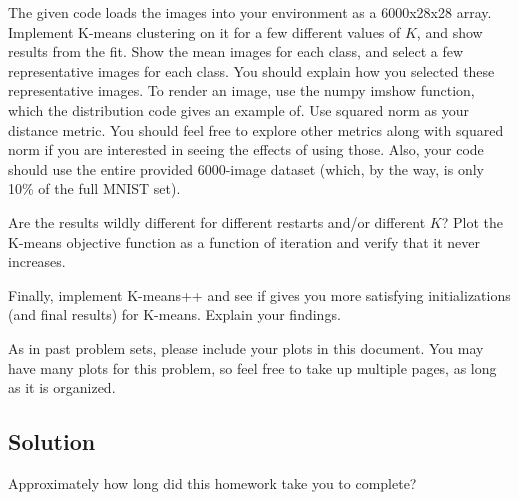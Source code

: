\documentclass[submit]{harvardml}
\begin{document}
\begin{problem}
The given code loads the images into your environment as a 6000x28x28 array. Implement K-means clustering on it for a few different values of $K$, and show results from the fit. Show the mean images for each class, and select a few representative images for each class. You should explain how you selected these representative images. To render an image, use the numpy imshow function, which the distribution code gives an example of. Use squared norm as your distance metric. You should feel free to explore other metrics along with squared norm if you are interested in seeing the effects of using those. Also, your code should use the entire provided 6000-image dataset (which, by the way, is only 10\% of the full MNIST set).

Are the results wildly different for different restarts and/or different $K$? Plot the K-means objective function as a function of iteration and verify that it never increases.

Finally, implement K-means++ and see if gives you more satisfying initializations (and final results) for K-means. Explain your findings.

As in past problem sets, please include your plots in this document. You may have many plots for this problem, so feel free to take up multiple pages, as long as it is organized.
\end{problem}
\subsection*{Solution}


\newpage
\begin{problem}[Calibration, 1pt]
Approximately how long did this homework take you to complete?
\end{problem}
\end{document}
